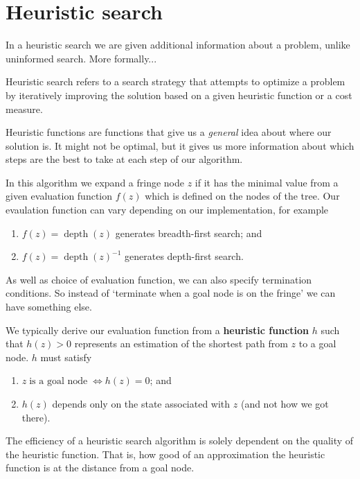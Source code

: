 \chapter{Heuristic search}

In a heuristic search we are given additional information about a problem, unlike uninformed search. More formally...

\begin{definition}
    Heuristic search refers to a search strategy that attempts to optimize a problem by iteratively improving the solution based on a given heuristic function or a cost measure.
\end{definition}

Heuristic functions are functions that give us a \emph{general} idea about where our solution is. It might not be optimal, but it gives us more information about which steps are the best to take at each step of our algorithm.

In this algorithm we expand a fringe node $z$ if it has the minimal value from a given evaluation function $f(z)$ which is defined on the nodes of the tree. Our evaulation function can vary depending on our implementation, for example
\begin{enumerate}
    \item $f(z) = \operatorname{depth}{(z)}$ generates breadth-first search; and
    \item $f(z) = \operatorname{depth}{(z)}^{-1}$ generates depth-first search.
\end{enumerate}

As well as choice of evaluation function, we can also specify termination conditions. So instead of `terminate when a goal node is on the fringe' we can have something else.

We typically derive our evaluation function from a \textbf{heuristic function} $h$ such that $h(z) > 0$ represents an estimation of the shortest path from $z$ to a goal node. $h$ must satisfy
\begin{enumerate}
    \item $z \;\text{is a goal node}\; \iff h(z) = 0$; and
    \item $h(z)$ depends only on the state associated with $z$ (and not how we got there).
\end{enumerate}

\begin{remark}
    The efficiency of a heuristic search algorithm is solely dependent on the quality of the heuristic function. That is, how good of an approximation the heuristic function is at the distance from a goal node.
\end{remark}

